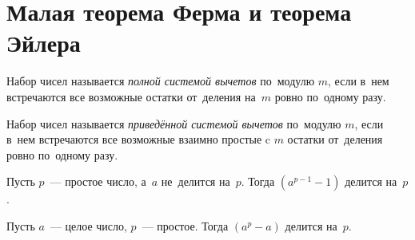 
\section*{Малая теорема Ферма и теорема Эйлера}


Набор чисел называется \emph{полной системой вычетов} по~модулю $m$, если в~нем
встречаются все возможные остатки от~деления на~$m$ ровно по~одному разу.

Набор чисел называется \emph{приведённой системой вычетов} по~модулю $m$, если
в~нем встречаются все возможные взаимно простые c $m$ остатки от~деления ровно
по~одному разу.

\mbox{}%
Пусть $p$~--- простое число, а~$a$ не~делится на~$p$.
Тогда $(a^{p-1} - 1)$ делится на~$p$.

\mbox{}%
Пусть $a$~--- целое число, $p$~--- простое.
Тогда $(a^p - a)$ делится на~$p$.

